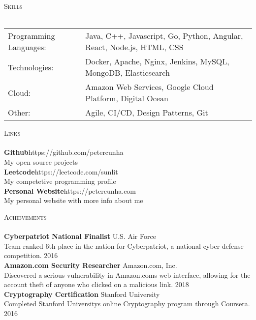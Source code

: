 \documentclass[a4paper]{article}
\newcommand{\lineunder} {
    \vspace*{-8pt} \\
    \hspace*{-18pt} \hrulefill \\
}
\newcommand{\header} [1] {
    {\hspace*{-18pt}\vspace*{6pt} \textsc{#1}}
    \vspace*{-6pt} \lineunder
}
\begin{document}
\header{Skills}
\begin{tabular}{ l l }
	Programming Languages: & Java, C++, Javascript, Go, Python, Angular, React, Node.js, HTML, CSS \\
	Technologies:          & Docker, Apache, Nginx, Jenkins, MySQL, MongoDB, Elasticsearch         \\
	Cloud:                 & Amazon Web Services, Google Cloud Platform, Digital Ocean             \\
	Other:                 & Agile, CI/CD, Design Patterns, Git                                    \\
\end{tabular}
\vspace{2mm}

\header{Links}
{\textbf{Github}}\hfill https://github.com/petercunha\\
My open source projects\\
\vspace*{2mm}
{\textbf{Leetcode}}\hfill https://leetcode.com/sunlit\\
My competetive programming profile\\
\vspace*{2mm}
{\textbf{Personal Website}}\hfill https://petercunha.com\\
My personal website with more info about me\\
\vspace*{2mm}

\header{Achievements}
\textbf{Cyberpatriot National Finalist} \hfill U.S. Air Force\\
Team ranked 6th place in the nation for Cyberpatriot, a national cyber defense competition. \hfill 2016\\
\vspace*{2mm}
\textbf{Amazon.com Security Researcher} \hfill Amazon.com, Inc.\\
Discovered a serious vulnerability in Amazon.com\textquotesingle{}s web interface, allowing for the account theft of anyone who clicked on a malicious link. \hfill 2018\\
\vspace*{2mm}
\textbf{Cryptography Certification} \hfill Stanford University\\
Completed Stanford University\textquotesingle{}s online Cryptography program through Coursera. \hfill 2016\\
\vspace*{2mm}

\ 
\end{document}
